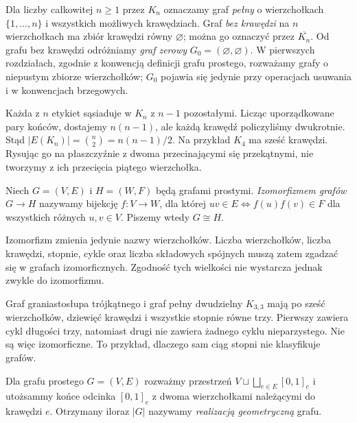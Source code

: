 \begin{definicja}
Dla liczby całkowitej $n\ge 1$ przez $K_n$ oznaczamy graf
\emph{pełny} o wierzchołkach $\{1,\ldots,n\}$ i wszystkich
możliwych krawędziach. Graf \emph{bez krawędzi} na $n$
wierzchołkach ma zbiór krawędzi równy $\varnothing$;
można go oznaczyć przez $\overline{K_n}$.
Od grafu bez krawędzi odróżniamy \emph{graf zerowy}
$G_0=(\varnothing,\varnothing)$. W pierwszych rozdziałach,
zgodnie z konwencją definicji grafu prostego, rozważamy
grafy o niepustym zbiorze wierzchołków; $G_0$ pojawia się
jedynie przy operacjach usuwania i w konwencjach brzegowych.
\end{definicja}

\begin{przyklad}
Każda z $n$ etykiet sąsiaduje w $K_n$ z $n-1$ pozostałymi.
Licząc uporządkowane pary końców, dostajemy $n(n-1)$,
ale każdą krawędź policzyliśmy dwukrotnie. Stąd
$|E(K_n)|=\binom n2=n(n-1)/2$.
Na przykład $K_4$ ma sześć krawędzi. Rysując go na płaszczyźnie
z dwoma przecinającymi się przekątnymi, nie tworzymy z ich
przecięcia piątego wierzchołka.
\end{przyklad}

\begin{definicja}[Izomorfizm]
Niech $G=(V,E)$ i $H=(W,F)$ będą grafami prostymi.
\emph{Izomorfizmem grafów} $G\to H$ nazywamy bijekcję
$f:V\to W$, dla której
$uv\in E\iff f(u)f(v)\in F$ dla wszystkich różnych $u,v\in V$.
Piszemy wtedy $G\cong H$.
\end{definicja}

Izomorfizm zmienia jedynie nazwy wierzchołków. Liczba wierzchołków,
liczba krawędzi, stopnie, cykle oraz liczba składowych spójnych
muszą zatem zgadzać się w grafach izomorficznych. Zgodność tych
wielkości nie wystarcza jednak zwykle do izomorfizmu.

\begin{przyklad}
Graf graniastosłupa trójkątnego i graf pełny dwudzielny $K_{3,3}$
mają po sześć wierzchołków, dziewięć krawędzi i wszystkie stopnie
równe trzy. Pierwszy zawiera cykl długości trzy, natomiast drugi
nie zawiera żadnego cyklu nieparzystego. Nie są więc izomorficzne.
To przykład, dlaczego sam ciąg stopni nie klasyfikuje grafów.
\end{przyklad}

\begin{definicja}
Dla grafu prostego $G=(V,E)$ rozważmy przestrzeń
$V\sqcup\bigsqcup_{e\in E}[0,1]_e$ i utożsammy
końce odcinka $[0,1]_e$ z dwoma wierzchołkami
należącymi do krawędzi $e$. Otrzymany iloraz
$|G|$ nazywamy \emph{realizacją geometryczną} grafu.
\end{definicja}

